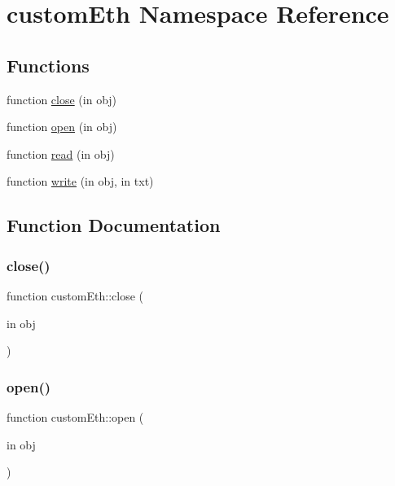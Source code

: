 \hypertarget{namespacecustom_eth}{}\section{custom\+Eth Namespace Reference}
\label{namespacecustom_eth}
\subsection*{Functions}
\begin{DoxyCompactItemize}
\item 
function \hyperlink{namespacecustom_eth_aec72e81865b78bd11ff26c921f44a582}{close} (in obj)
\item 
function \hyperlink{namespacecustom_eth_ab0ebd2b872b0f3b8c1f33cb0ba5fa326}{open} (in obj)
\item 
function \hyperlink{namespacecustom_eth_a42b4507db8236b8a8a6632decfe76543}{read} (in obj)
\item 
function \hyperlink{namespacecustom_eth_acc2e5fdb38158d81a1347fd6dd2e75de}{write} (in obj, in txt)
\end{DoxyCompactItemize}


\subsection{Function Documentation}
\mbox{\label{namespacecustom_eth_aec72e81865b78bd11ff26c921f44a582}} 
\subsubsection{\texorpdfstring{close()}{close()}}
{\footnotesize\ttfamily function custom\+Eth\+::close (\begin{DoxyParamCaption}\item[{in}]{obj }\end{DoxyParamCaption})}

\mbox{\label{namespacecustom_eth_ab0ebd2b872b0f3b8c1f33cb0ba5fa326}} 
\subsubsection{\texorpdfstring{open()}{open()}}
{\footnotesize\ttfamily function custom\+Eth\+::open (\begin{DoxyParamCaption}\item[{in}]{obj }\end{DoxyParamCaption})}


